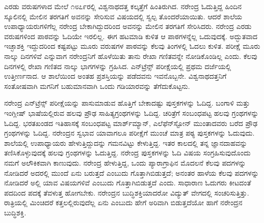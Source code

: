 ಎರಡು ವರುಷಗಳಾದ ಮೇಲೆ ೧೮೭೯ರಲ್ಲಿ ವಿಶ್ವನಾಥದತ್ತ ಕಲ್ಕತ್ತೆಗೆ ಹಿಂತಿರುಗಿದ. ನರೇಂದ್ರ ಓದುತ್ತಿದ್ದ ಹಿಂದಿನ ಸ್ಕೂಲಿನಲ್ಲಿ ಮೇಲಿನ ತರಗತಿಗೆ ಅವನನ್ನು ಸೇರಿಸುವ ವಿಷಯದಲ್ಲಿ ಸ್ವಲ್ಪ ತೊಂದರೆಯಾಯಿತು. ಆದರೆ ಶಾಲೆಯ ಉಪಾಧ್ಯಾಯರುಗಳಿಗೆಲ್ಲ ನರೇಂದ್ರ ಬೇಕಾಗಿದ್ದುದರಿಂದ ಅವನನ್ನು ಮೇಲಿನ ತರಗತಿಗೆ ಸೇರಿಸಿದರು. ನರೇಂದ್ರ ಎರಡು ವರುಷಗಳಿಂದ ಪಾಠವನ್ನು ಓದಿಯೇ ಇರಲಿಲ್ಲ. ಈಗ ಹಟಮಾಡಿ ಕುಳಿತ ಆ ಪಾಠಗಳನ್ನೆಲ್ಲ ಒದುವುದಕ್ಕೆ. ಅದ್ಭುತವಾದ ಇಚ್ಛಾಶಕ್ತಿ ಇದ್ದುದರಿಂದ ಕಷ್ಟಪಟ್ಟು ಮೂರು ವರುಷಗಳ ಪಾಠವನ್ನು ಕೆಲವು ತಿಂಗಳಲ್ಲಿ ಓದಲು ಕುಳಿತ. ಪರೀಕ್ಷೆ ಮೂರು ನಾಲ್ಕು ದಿನಗಳಿವೆ ಎನ್ನುವಾಗ ನರೇಂದ್ರನಿಗೆ ಹೊಳೆಯಿತು ತಾನು ರೇಖಾ ಗಣಿತವನ್ನೇ ನೋಡಿಕೊಂಡಿಲ್ಲ ಎಂದು. ಕೆಲವು ದಿನಗಳಲ್ಲಿ ರೇಖಾ ಗಣಿತದ ನಾಲ್ಕು ಭಾಗಗಳನ್ನು ಗ್ರಹಿಸಿದ. ಎನ್‍ಟ್ರೆನ್ಸ್ ಪರೀಕ್ಷೆಯಲ್ಲಿ ಪ್ರಥಮ ದರ್ಜೆಯಲ್ಲಿ ಉತ್ತೀರ್ಣನಾದ. ಆ ಶಾಲೆಯಿಂದ ಅಂತಹ ಪ್ರಶಸ್ತಿಯನ್ನು ಪಡೆದವನು ಇವನೊಬ್ಬನೇ. ವಿಶ್ವನಾಥದತ್ತನಿಗೆ ಸಂತೋಷವಾಗಿ ಮಗನಿಗೆ ಬಹುಮಾನವಾಗಿ ಒಂದು ಗಡಿಯಾರವನ್ನು ತೆಗೆದುಕೊಟ್ಟನು.

ನರೇಂದ್ರ ಎನ್‍ಟ್ರೆನ್ಸ್ ಪರೀಕ್ಷೆಯನ್ನು ಪಾಸುಮಾಡುವ ಹೊತ್ತಿಗೆ ಬೇಕಾದಷ್ಟು ಪುಸ್ತಕಗಳನ್ನು ಓದಿದ್ದ. ಬಂಗಾಳಿ ಮತ್ತು ಇಂಗ್ಲೀಷ್ ಭಾಷೆಯಲ್ಲಿರುವ ಹಲವು ಪ್ರೌಢ ಸಾಹಿತ್ಯಗ್ರಂಥಗಳನ್ನು ಓದಿದ್ದ. ಚರಿತ್ರೆಗೆ ಸಂಬಂಧಪಟ್ಟ ಹಲವು ಗ್ರಂಥಗಳನ್ನು ಓದಿದ್ದ. ಭರತಖಂಡದ ಇತಿಹಾಸಕ್ಕೆ ಸಂಬಂಧಪಟ್ಟ ಮಾರ್ಶ್‍ಮ್ಯಾನ್, ಎಲೆಫೆನ್‍ಸ್ಟೋನ್ ಮುಂತಾದವರು ಬರೆದ ಪ್ರೌಢ ಗ್ರಂಥಗಳನ್ನು ಓದಿದ್ದ. ನರೇಂದ್ರನ ಸ್ವಭಾವ ಯಾವಾಗಲೂ ಪರೀಕ್ಷೆಗೆ ಮುಂಚೆ ಮಾತ್ರ ಪಠ್ಯ ಪುಸ್ತಕಗಳನ್ನು ಓದುವುದು. ಶಾಲೆಯಲ್ಲಿ ಉಪಾಧ್ಯಾಯರು ಹೇಳುತ್ತಿದ್ದುದನ್ನು ಗಮನವಿಟ್ಟು ಕೇಳುತ್ತಿದ್ದ. ಇತರ ಕಾಲದಲ್ಲಿ ತನ್ನ ಜ್ಞಾನದಾಹವನ್ನು ತಣಿಸಿಕೊಳ್ಳುವುದಕ್ಕೆ ಹಲವು ಗ್ರಂಥಗಳನ್ನು ಓದುತ್ತಿದ್ದ. ನರೇಂದ್ರ ಪುಸ್ತಕಗಳನ್ನು ಓದಿ ವಿಷಯ ಸಂಗ್ರಹಿಸುವುದೊಂದು ನಮಗೆ ಅಲೌಕಿಕವಾಗಿ ಕಾಣುವುದು. ನರೇಂದ್ರ ಹೇಳುತ್ತಿದ್ದ, ಒಂದು ಪ್ಯಾರಾಗ್ರಾಫಿನ ಮೊದಲನೆ ಕೆಲವು ಪದಗಳನ್ನು ನೋಡಿದರೆ ಅದರಲ್ಲಿ ಮುಂದೆ ಏನು ಬರುತ್ತದೆ ಎಂಬುದು ಗೊತ್ತಾಗಿಬಿಡುತ್ತದೆ; ಅನಂತರ ಹಾಳೆಯ ಕೆಲವು ಪದಗಳನ್ನು ನೋಡಿದರೆ ಅಲ್ಲಿ ಯಾವ ವಿಷಯಗಳಿವೆ ಎಂಬುದು ಗೊತ್ತಾಗಿಬಿಡುತ್ತದೆ ಎಂದು. ಸಾಧಾರಾಣ ಓದುಗರು ಕೀಟದಂತೆ ಪದದಿಂದ ಪದಕ್ಕೆ ತೆವಳುತ್ತ ಹೋಗಬೇಕು. ನರೇಂದ್ರನ ಬುದ್ಧಿಶಕ್ತಿಯಾದರೋ ವಿದ್ಯುತ್ ವೇಗದಲ್ಲಿ ಸಂಚರಿಸುತ್ತಿತ್ತು. ರಾತ್ರಿಯಲ್ಲಿ ಮಿಂಚಿದರೆ ಕತ್ತಲಲ್ಲಿರುವುದೆಲ್ಲ ಏನು ಎಂಬುದು ಹೇಗೆ ಅರಿವಾಗಿ ಬಿಡುತ್ತದೆಯೋ ಹಾಗೆ ನರೇಂದ್ರನ ಬುದ್ಧಿಶಕ್ತಿ.


